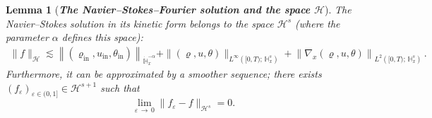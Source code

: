 \documentclass[10pt]{amsart}
\newtheorem{lemm}[theo]{Lemma}\newtheorem{prop}[theo]{Proposition}\newtheorem{coro}[theo]{Corollary}\newtheorem{conj}[theo]{Conjecture}
\theoremstyle{definition}\newtheorem{defi}[theo]{Definition}\newtheorem{rema}[theo]{Remark}\newtheorem{exam}[theo]{Example}\newtheorem{exem}[theo]{Example}\newtheorem{nota}[theo]{Notation}
\newcommand{\ini}{\mathrm{in}}
\newcommand{\bbH}{\mathbb{H}}
\newcommand{\HHH}{\mathscr{H}}
\newcommand{\SSSs}{\HHH}
\newcommand{\rSSSs}[1]{\HHH^{#1}}
\newcommand*\eps{{\varepsilon}}
\newcommand{\thttl}[1]{\emph{\textbf{#1}}}
\begin{document}
\begin{lemm}[\thttl{The Navier--Stokes--Fourier solution and the space $\SSSs$}]\label{lem:NS_parabolic_space}
The Navier--Stokes solution in its kinetic form belongs to the space $\rSSSs{s}$ (where the parameter $\alpha$ defines this space):
\begin{align*}
\| f \|_{ \SSSs } \lesssim \left\| \left(\varrho_\ini, u_\ini, \theta_\ini\right) \right\|_{ \dot{\bbH}^{-\alpha}_x } + \| (\varrho, u, \theta) \|_{ L^\infty \left([0, T) ;\,\bbH^s_x \right) } + \left\| \nabla_x (\varrho, u, \theta) \right\|_{ L^2 \left([0, T) ;\,\bbH^s_x \right) }\,.
\end{align*}
Furthermore, it can be approximated by a smoother sequence; there exists $(f_\eps)_{ \eps \in (0, 1] } \in \rSSSs{s+1}$ such that
\[
\lim_{\eps\, \to\,0} \| f_\eps - f \|_{\rSSSs{s}}=0.
\]
\end{lemm}
\end{document}

